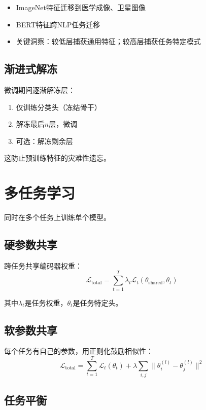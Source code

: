 \begin{itemize}
    \item ImageNet特征迁移到医学成像、卫星图像
    \item BERT特征跨NLP任务迁移
    \item 关键洞察：较低层捕获通用特征；较高层捕获任务特定模式
\end{itemize}

\subsection{渐进式解冻}

微调期间逐渐解冻层：
\begin{enumerate}
    \item 仅训练分类头（冻结骨干）
    \item 解冻最后$n$层，微调
    \item 可选：解冻剩余层
\end{enumerate}

这防止预训练特征的灾难性遗忘。

\section{多任务学习}

同时在多个任务上训练单个模型。

\subsection{硬参数共享}

跨任务共享编码器权重：
\begin{equation}
\mathcal{L}_{\text{total}} = \sum_{t=1}^{T} \lambda_t \mathcal{L}_t(\theta_{\text{shared}}, \theta_t)
\end{equation}

其中$\lambda_t$是任务权重，$\theta_t$是任务特定头。

\subsection{软参数共享}

每个任务有自己的参数，用正则化鼓励相似性：
\begin{equation}
\mathcal{L}_{\text{total}} = \sum_{t=1}^{T} \mathcal{L}_t(\theta_t) + \lambda \sum_{i,j} \|\theta_i^{(l)} - \theta_j^{(l)}\|^2
\end{equation}

\subsection{任务平衡}

